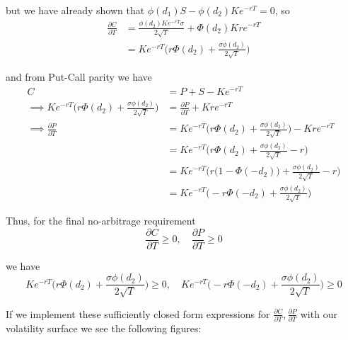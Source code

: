 \documentclass[11pt]{article}
\newlength\tindent
\renewcommand{\indent}{\hspace*{\tindent}}
\begin{document}
but we have already shown that $\phi(d_1)S - \phi(d_2)Ke^{-rT} = 0$, so
\begin{align*}
	\frac{\partial C}{\partial T} &= \frac{\phi(d_2)Ke^{-rT}\sigma}{2\sqrt{T}} + \Phi(d_2)Kre^{-rT} \\
	&= Ke^{-rT}\bigg( r\Phi(d_2) + \frac{\sigma\phi(d_2)}{2\sqrt{T}} \bigg)
\end{align*}

and from Put-Call parity we have
\begin{align*}
	C &= P + S - Ke^{-rT} \\
	\implies Ke^{-rT}\bigg( r\Phi(d_2) + \frac{\sigma\phi(d_2)}{2\sqrt{T}} \bigg) &= \frac{\partial P}{\partial T} + Kre^{-rT} \\
	\implies \frac{\partial P}{\partial T} &= Ke^{-rT}\bigg( r\Phi(d_2) + \frac{\sigma\phi(d_2)}{2\sqrt{T}} \bigg) - Kre^{-rT} \\
	&= Ke^{-rT}\bigg( r\Phi(d_2) + \frac{\sigma\phi(d_2)}{2\sqrt{T}} - r\bigg) \\
	&= Ke^{-rT}\bigg( r\big(1 - \Phi(-d_2)\big) + \frac{\sigma\phi(d_2)}{2\sqrt{T}} - r\bigg) \\
	&= Ke^{-rT}\bigg(- r\Phi(-d_2) + \frac{\sigma\phi(d_2)}{2\sqrt{T}}\bigg)
\end{align*}

Thus, for the final no-arbitrage requirement
\begin{equation*}
	\frac{\partial C}{\partial T} \geq 0, \quad \frac{\partial P}{\partial T} \geq 0
\end{equation*}

we have
\begin{equation*}
	Ke^{-rT}\bigg( r\Phi(d_2) + \frac{\sigma\phi(d_2)}{2\sqrt{T}} \bigg) \geq 0, \quad Ke^{-rT}\bigg(- r\Phi(-d_2) + \frac{\sigma\phi(d_2)}{2\sqrt{T}}\bigg) \geq 0
\end{equation*}

\indent If we implement these sufficiently closed form expressions for $\frac{\partial C}{\partial T}, \frac{\partial P}{\partial T}$ with our volatility surface we see the following figures:
\end{document}
